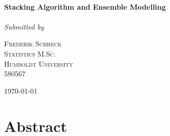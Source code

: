 \documentclass[12pt]{article}
\begin{document}
\begin{titlepage}
	\center
	\HRule\\[0.4cm]
	
	{\Large\bfseries Stacking Algorithm and Ensemble Modelling}\\[0.05cm] %
		\HRule\\[1.5cm]
	
			
			\textit{Submitted by}\\	
			\vspace{0.5cm}
			

	\begin{minipage}{0.5\textwidth}
		\begin{center}
			\large

			\textsc{Frederik Schreck \\
			Statistics M.Sc.\\
			Humboldt University\\
			580567} %
		\end{center}

	\end{minipage}
	

	\vfill\vfill\vfill\vfill %
	
	{\large\today} %
	
	\vfill %
	
\end{titlepage}


\tableofcontents
\thispagestyle{empty}
\clearpage
\setcounter{page}{1}
\newpage

\listoffigures
\listoftables
\listofalgorithms

\thispagestyle{empty}
\clearpage
\setcounter{page}{1}




\section{Abstract}
\end{document}
